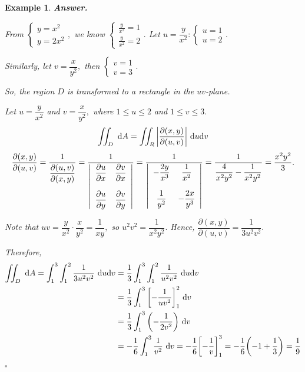 \documentclass[12pt,a4paper]{article}
\newtheorem{eg}{Example}[subsection]
\newenvironment*{ans}{\par\indent\textbf{\textit{Answer. }}\par}{\par\hfill{$\square$}\par}
\def\dsst{\displaystyle}
\def\d{{\mathrm{d}}}
\def\del{\partial}
\def\iintR{\dsst\iint_R}
\def\iintD{\dsst\iint_D}
\begin{document}
\begin{eg}
\begin{ans}
	From $\begin{cases}y=x^2\\y=2x^2\end{cases},$ we know $\begin{cases}\frac{y}{x^2}=1\\\frac{y}{x^2}=2\end{cases}.$ Let $u=\dfrac{y}{x^2}: \begin{cases}u=1\\u=2\end{cases}.$ \par Similarly, let $v=\dfrac{x}{y^2},$ then $\begin{cases}v=1\\v=3\end{cases}.$\par So, the region $D$ is transformed to a rectangle in the $uv$-plane. \par Let $u=\dfrac{y}{x^2}$ and $v=\dfrac{x}{y^2},$ where $1\leq u\leq 2$ and $1\leq v\leq 3.$ \[\iintD\ \d A=\iintR\qty|\dfrac{\del(x,y)}{\del(u,v)}|\ \d u\d v\] \[\dfrac{\del(x,y)}{\del(u,v)}=\dfrac{1}{\dfrac{\del(u,v)}{\del(x,y)}}=\dfrac{1}{\qty|\begin{array}{cc}\dfrac{\del u}{\del x}&\dfrac{\del v}{\del x}\\\\\dfrac{\del u}{\del y}&\dfrac{\del v}{\del y}\end{array}|}=\dfrac{1}{\qty|\begin{array}{cc}-\dfrac{2y}{x^3}&\dfrac{1}{x^2}\\\\\dfrac{1}{y^2}&-\dfrac{2x}{y^3}\end{array}|}=\dfrac{1}{\dfrac{4}{x^2y^2}-\dfrac{1}{x^2y^2}}=\dfrac{x^2y^2}{3}.\]\par Note that $uv=\dfrac{y}{x^2}\cdot\dfrac{x}{y^2}=\dfrac{1}{xy},$ so $u^2v^2=\dfrac{1}{x^2y^2}.$ Hence, $\dfrac{\del(x,y)}{\del(u,v)}=\dfrac{1}{3u^2v^2}.$\par Therefore, \[\begin{aligned}\iintD\ \d A=\int_1^3\int_1^2\dfrac{1}{3u^2v^2}\ \d u\d v&=\dfrac{1}{3}\int_1^3\int_1^2\dfrac{1}{u^2v^2}\ \d u\d v\\&=\dfrac{1}{3}\int_1^3\qty[-\dfrac{1}{uv^2}]_1^2\ \d v\\&=\dfrac{1}{3}\int_1^3\qty(-\dfrac{1}{2v^2})\ \d v\\&=-\dfrac{1}{6}\int_1^3\dfrac{1}{v^2}\ \d v=-\dfrac{1}{6}\qty[-\dfrac{1}{v}]_1^3=-\dfrac{1}{6}\qty(-1+\dfrac{1}{3})=\dfrac{1}{9}\end{aligned}\]
	\end{ans}
\end{eg}
\end{document}
